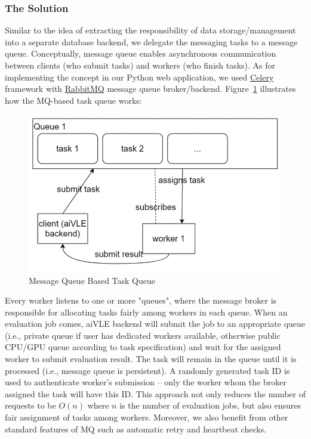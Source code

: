\subsubsection{The Solution}
Similar to the idea of extracting the responsibility of data storage/management into a separate database backend, we delegate the messaging tasks to a message queue. Conceptually, message queue enables asynchronous communication between clients (who submit tasks) and workers (who finish tasks). As for implementing the concept in our Python web application, we used \href{https://docs.celeryq.dev/en/stable/}{Celery} framework with \href{https://www.rabbitmq.com/}{RabbitMQ} message queue broker/backend. Figure~\ref{fig:aivle-web-mq} illustrates how the MQ-based task queue works:

\begin{figure}[H]
    \centering
    \includegraphics{images/aivle-web-mq.png}
    \caption{Message Queue Based Task Queue}
    \label{fig:aivle-web-mq}
\end{figure}

Every worker listens to one or more "queues", where the message broker is responsible for allocating tasks fairly among workers in each queue. When an evaluation job comes, aiVLE backend will submit the job to an appropriate queue (i.e., private queue if user has dedicated workers available, otherwise public CPU/GPU queue according to task specification) and wait for the assigned worker to submit evaluation result. The task will remain in the queue until it is processed (i.e., message queue is persistent). A randomly generated task ID is used to authenticate worker's submission – only the worker whom the broker assigned the task will have this ID. This approach not only reduces the number of requests to be $O(n)$ where $n$ is the number of evaluation jobs, but also ensures fair assignment of tasks among workers. Moreover, we also benefit from other standard features of MQ such as automatic retry and heartbeat checks.

